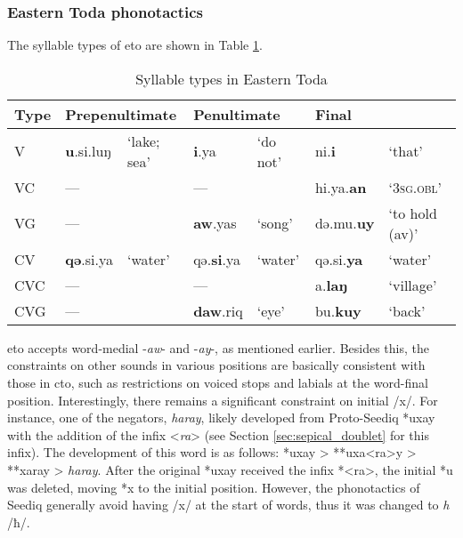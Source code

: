 \subsubsection{Eastern Toda phonotactics} \label{sec:eto_phonotactics}


The syllable types of \acl{eto} are shown in Table \ref{tab:sy_ty_eto}. 

\begin{table}[!htbp]
\centering
\caption{Syllable types in Eastern Toda}
\label{tab:sy_ty_eto}
\begin{tabular}{lllllll}
\hline
Type & \multicolumn{2}{l}{Prepenultimate} & \multicolumn{2}{l}{Penultimate} & \multicolumn{2}{l}{Final}                \\ \hline
V             & \textbf{u}.si.luŋ & `lake; sea'    & \textbf{i}.ya            & `do not'         & ni.\textbf{i}        & `that' \\
VC            & ---              &                 & ---             &               & hi.ya.\textbf{an}       & `\textsc{3sg.obl}'           \\
VG            & ---              &                 & \textbf{aw}.yas   & `song' & də.mu.\textbf{uy} &  `to hold (\acs{av})'        \\
CV            & \textbf{qə}.si.ya         & `water'         & qə.\textbf{si}.ya        & `water'       & qə.si.\textbf{ya}    & `water'                    \\
CVC           & ---              &                 & ---             &               & a.\textbf{laŋ}      & `village'                    \\
CVG           & ---              &                 & \textbf{daw}.riq     & `eye'    & bu.\textbf{kuy}      & `back'                     \\ \hline
\end{tabular}
\end{table}

\acl{eto} accepts word-medial -\textit{aw}- and -\textit{ay}-, as mentioned earlier. Besides this, the constraints on other sounds in various positions are basically consistent with those in \acl{cto}, such as restrictions on voiced stops and labials at the word-final position. Interestingly, there remains a significant constraint on initial /x/. For instance, one of the negators, \textit{haray}, likely developed from Proto-Seediq *uxay with the addition of the infix <\textit{ra}> (see Section \ref{sec:sepical_doublet} for this infix). The development of this word is as follows: *uxay > **uxa<ra>y > **xaray > \textit{haray}. After the original *uxay received the infix *<ra>, the initial *u was deleted, moving *x to the initial position. However, the phonotactics of Seediq generally avoid having /x/ at the start of words, thus it was changed to \textit{h} /ħ/.

